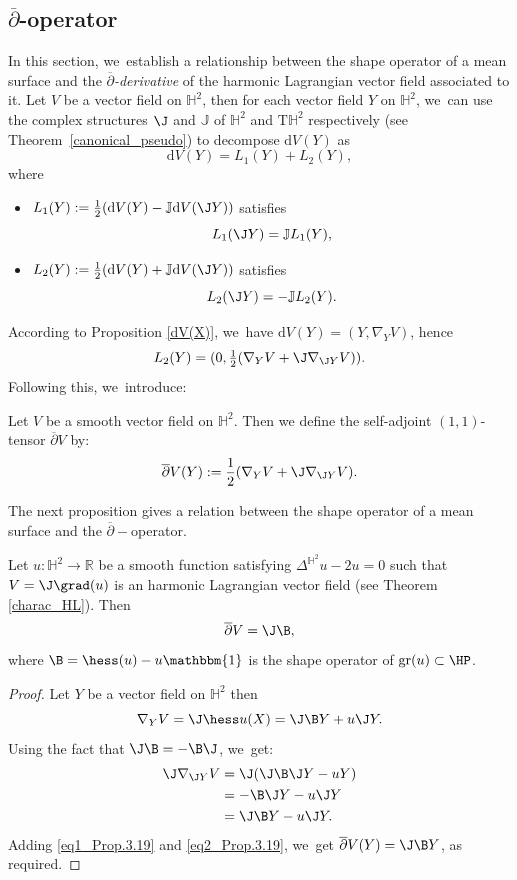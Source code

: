 \subsection{\texorpdfstring{$\overline{\partial}$-operator}{dbar-operator}}\label{Sec_dbar_operator}
In this section, we~establish a relationship between the shape operator of a mean surface and the \emph{$\overline{\partial}$-derivative} of the harmonic Lagrangian vector field associated to it. Let $V$ be a vector field on $\mathbb{H}^2$, then for each vector field $Y$ on $\mathbb{H}^2$, we~can use the complex structures $\J$ and $\mathbb{J}$ of $\mathbb{H}^2$ and $\mathrm{T}\mathbb{H}^2$ respectively (see Theorem~\ref{canonical_pseudo}) to decompose $\mathrm{d}V(Y)$ as
\[
\mathrm{d}V(Y)=L_1(Y)+L_2(Y),
\]
where \begin{itemize}
\item $L_1(Y):=\frac{1}{2}(\mathrm{d}V(Y)-\mathbb{J}\mathrm{d}V(\J Y))$ satisfies
\[
L_1(\J Y)=\mathbb{J}L_1(Y),
\]
\item $L_2(Y):=\frac{1}{2}(\mathrm{d}V(Y)+\mathbb{J}\mathrm{d}V(\J Y))$ satisfies
\[
L_2(\J Y)=-\mathbb{J}L_2(Y).
\]
\end{itemize}
According to Proposition \ref{dV(X)}, we~have $\mathrm{d}V(Y)=(Y,\nabla_YV)$, hence
\[
L_2(Y)=(0,\tfrac{1}{2}(\nabla_YV+\J\nabla_{\J Y}V)).
\]
Following this, we~introduce:
\begin{defi}
Let $V$ be a smooth vector field on $\mathbb{H}^2$. Then we define the self-adjoint $(1,1)$-tensor $\overline{\partial}V$ by:
\begin{equation}\label{dbar_H2}
\overline{\partial}V(Y):=\frac{1}{2}(\nabla_YV+\J\nabla_{\J Y}V).
\end{equation}
\end{defi}
The next proposition gives a relation between the shape operator of a mean surface and the $\overline{\partial}-$operator.
\begin{lemma}\label{d_bar_and_shape_operator}
Let $u:\mathbb{H}^2\to\mathbb{R}$ be a smooth function satisfying $\Delta^{\mathbb{H}^2} u-2u=0$ such that $V=\J\grad(u)$ is an harmonic Lagrangian vector field (see Theorem
\ref{charac_HL}). Then
\[
\overline{\partial}V=\J\B,
\]
where $\B=\hess(u)-u\mathbbm{1}$ is the shape operator of $\mathrm{gr}(u)\subset\HP$.
\end{lemma}
\begin{proof}
Let $Y$ be a vector field on $\mathbb{H}^2$ then
\begin{equation}\label{eq1_Prop.3.19}
\nabla_YV=\J\hess u(X)=\J\B Y+u\J Y.
\end{equation}
Using the fact that $\J \B=-\B\J$, we~get:
\begin{align}\label{eq2_Prop.3.19}
\begin{split}
\J\nabla_{\J Y}V&=\J(\J \B \J Y-uY)\\
&=-\B \J Y-u\J Y\\
&=\J \B Y-u\J Y.
\end{split}
\end{align}
Adding \eqref{eq1_Prop.3.19} and \eqref{eq2_Prop.3.19}, we~get $ \overline{\partial}V(Y)=\J \B Y$, as required. \end{proof}
